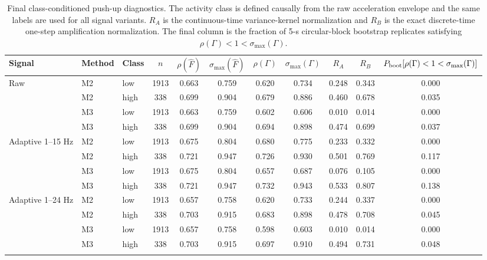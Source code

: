 \begin{table}[t]
\centering
\small
\setlength{\tabcolsep}{3.8pt}
\begin{tabular}{lllcccccccc}
\toprule
Signal & Method & Class & $n$ & $\rho(\widehat F)$ & $\sigma_{\max}(\widehat F)$ & $\rho(\Gamma)$ & $\sigma_{\max}(\Gamma)$ & $R_A$ & $R_B$ & $P_{\rm boot}[\rho(\Gamma)<1<\sigma_{\max}(\Gamma)]$ \\
\midrule
Raw & M2 & low & 1913 & 0.663 & 0.759 & 0.620 & 0.734 & 0.248 & 0.343 & 0.000 \\
 & M2 & high & 338 & 0.699 & 0.904 & 0.679 & 0.886 & 0.460 & 0.678 & 0.035 \\
 & M3 & low & 1913 & 0.663 & 0.759 & 0.602 & 0.606 & 0.010 & 0.014 & 0.000 \\
 & M3 & high & 338 & 0.699 & 0.904 & 0.694 & 0.898 & 0.474 & 0.699 & 0.037 \\
\addlinespace
Adaptive 1--15 Hz & M2 & low & 1913 & 0.675 & 0.804 & 0.680 & 0.775 & 0.233 & 0.332 & 0.000 \\
 & M2 & high & 338 & 0.721 & 0.947 & 0.726 & 0.930 & 0.501 & 0.769 & 0.117 \\
 & M3 & low & 1913 & 0.675 & 0.804 & 0.657 & 0.687 & 0.076 & 0.105 & 0.000 \\
 & M3 & high & 338 & 0.721 & 0.947 & 0.732 & 0.943 & 0.533 & 0.807 & 0.138 \\
\addlinespace
Adaptive 1--24 Hz & M2 & low & 1913 & 0.657 & 0.758 & 0.620 & 0.733 & 0.244 & 0.337 & 0.000 \\
 & M2 & high & 338 & 0.703 & 0.915 & 0.683 & 0.898 & 0.478 & 0.708 & 0.045 \\
 & M3 & low & 1913 & 0.657 & 0.758 & 0.598 & 0.603 & 0.010 & 0.014 & 0.000 \\
 & M3 & high & 338 & 0.703 & 0.915 & 0.697 & 0.910 & 0.494 & 0.731 & 0.048 \\
\addlinespace
\bottomrule
\end{tabular}
\caption{Final class-conditioned push-up diagnostics. The activity class is defined causally from the raw acceleration envelope and the same labels are used for all signal variants. $R_A$ is the continuous-time variance-kernel normalization and $R_B$ is the exact discrete-time one-step amplification normalization. The final column is the fraction of 5-s circular-block bootstrap replicates satisfying $\rho(\Gamma)<1<\sigma_{\max}(\Gamma)$.}
\label{tab:pushup_final_subsets}
\end{table}